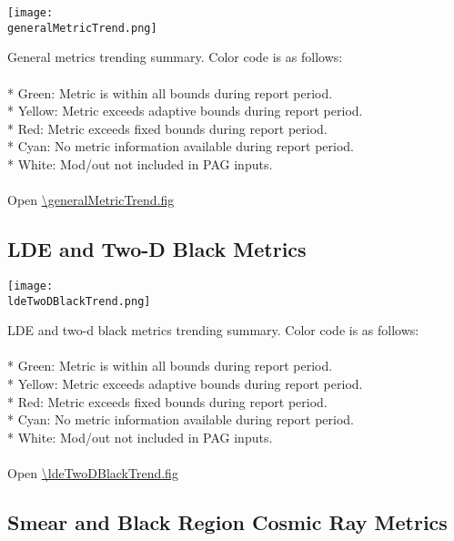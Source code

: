\begin{center}
\texttt{[image: \\generalMetricTrend.png]}
\end{center}
General metrics trending summary. Color code is as follows:\\
\\
* Green: Metric is within all bounds during report period.\\
* Yellow: Metric exceeds adaptive bounds during report period.\\
* Red: Metric exceeds fixed bounds during report period.\\
* Cyan: No metric information available during report period.\\
* White: Mod/out not included in PAG inputs.\\
\\
Open \url{\generalMetricTrend.fig}

\newpage

\subsection{LDE and Two-D Black Metrics}

\begin{center}
\texttt{[image: \\ldeTwoDBlackTrend.png]}
\end{center}
LDE and two-d black metrics trending summary. Color code is as follows:\\
\\
* Green: Metric is within all bounds during report period.\\
* Yellow: Metric exceeds adaptive bounds during report period.\\
* Red: Metric exceeds fixed bounds during report period.\\
* Cyan: No metric information available during report period.\\
* White: Mod/out not included in PAG inputs.\\
\\
Open \url{\ldeTwoDBlackTrend.fig}

\newpage

\subsection{Smear and Black Region Cosmic Ray Metrics}

